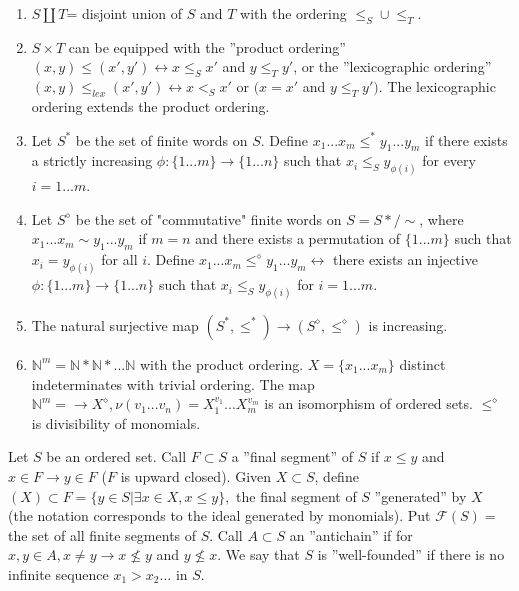 \begin{enumerate}
  \item $S \coprod T$= disjoint union of $S$ and $T$ with the ordering $\leq_S \cup \leq_T$.
  \item $S \times T$ can be equipped with the ''product ordering'' $(x,y)\leq(x',y') \leftrightarrow x \leq_S x'$ and $y \leq_T y'$, or the ''lexicographic ordering'' $(x,y) \leq_{lex} (x',y') \leftrightarrow x <_S x'$ or $(x=x'$ and $y \leq_T y')$. The lexicographic ordering extends the product ordering.
  \item Let $S^*$ be the set of finite words on $S$. Define $x_{1}...x_{m} \leq^{*} y_{1}...y_{m}$ if there exists a strictly increasing $\phi: \{1...m\} \rightarrow \{1...n\}$ such that $x_i \leq_S y_{\phi(i)}$ for every $i=1...m$.
  \item Let $S^\diamond$ be the set of "commutative" finite words on $S=S*/ \sim$, where $x_{1}...x_{m} \sim y_{1}...y_{m}$ if $m=n$ and there exists a permutation of $\{1...m\}$ such that $x_i = y_{\phi(i)}$ for all $i$. Define  $x_{1}...x_{m} \leq^{\diamond} y_{1}...y_{m} \leftrightarrow$ there exists an injective $\phi: \{1...m\} \rightarrow \{1...n\}$ such that $x_i \leq_S y_{\phi(i)}$ for $i=1...m$.
  \item The natural surjective map $(S^*, \leq^*) \rightarrow (S^\diamond, \leq^\diamond)$ is increasing.
  \item $\mathbb{N}^m=\mathbb{N} * \mathbb{N} * ...\mathbb{N}$ with the product ordering. $X=\{x_1...x_m\}$ distinct indeterminates with trivial ordering. The map $\mathbb{N}^m= \rightarrow X^\diamond, \nu(v_1...v_n)=X_{1}^{v_1}...X_{m}^{v_m}$ is an isomorphism of ordered sets. $\leq^\diamond$ is divisibility of monomials.
\end{enumerate}
\WikiSigleStar Let $S$ be an ordered set. Call $F \subset S$ a ''final segment'' of $S$ if $x \leq y$ and $x \in F \rightarrow y \in F$ ($F$ is upward closed). Given $X \subset S$, define $(X) \subset F = \{y \in S|\exists x \in X, x \leq y\},$ the final segment of $S$ ''generated'' by $X$ (the notation corresponds to the ideal generated by monomials). Put $\mathcal{F}(S)=$ the set of all finite segments of $S$. Call $A \subset S$ an ''antichain'' if for $x, y \in A, x \neq y \rightarrow x \not\leq y$ and $y \not\leq x$. We say that $S$ is ''well-founded'' if there is no infinite sequence $x_{1}>x_{2}...$ in $S$.
